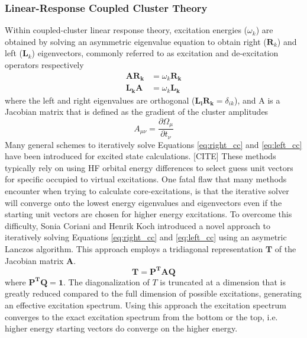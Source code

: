 \documentclass[final]{emory}
\begin{document}
\subsubsection{Linear-Response Coupled Cluster Theory}
Within coupled-cluster linear response theory, excitation energies ($\omega_{k}$) are obtained by solving an asymmetric eigenvalue equation to obtain right ($\mathbf{R}_k $) and left ($\mathbf{L}_k$) eigenvectors, commonly referred to as excitation and de-excitation operators respectively
\begin{align}
\label{eq:right_cc}
\mathbf{AR_k} &= \omega_k \mathbf{R_k} \\
\label{eq:left_cc}
\mathbf{L_kA} &= \omega_k \mathbf{L_k}
\end{align}
where the left and right eigenvalues are orthogonal ($\mathbf{L_iR_k} = \delta_{ik}$), and A is a Jacobian matrix that is defined as the gradient of the cluster amplitudes
\begin{equation}
A_{\mu \nu} = \frac{\partial \Omega_{\mu}}{\partial t_\nu}
\end{equation}
Many general schemes to iteratively solve Equations \ref{eq:right_cc} and \ref{eq:left_cc} have been introduced for excited state calculations. [CITE] These methods typically rely on using HF orbital energy differences to select guess unit vectors for specific occupied to virtual excitations. One fatal flaw that many methods encounter when trying to calculate core-excitations, is that the iterative solver will converge onto the lowest energy eigenvalues and eigenvectors even if the starting unit vectors are chosen for higher energy excitations. To overcome this difficulty, Sonia Coriani and Henrik Koch introduced a novel approach to iteratively solving Equations \ref{eq:right_cc} and \ref{eq:left_cc} using an asymetric Lanczos algorithm. This approach employs a tridiagonal representation $\mathbf{T}$ of the Jacobian matrix $\mathbf{A}$. 
\begin{equation}
\mathbf{T} = \mathbf{P^T A Q}
\end{equation}
where $\mathbf{P^TQ} = \mathbf{1}$. The diagonalization of $T$ is truncated at a dimension that is greatly reduced compared to the full dimension of possible excitations, generating an effective excitation spectrum. Using this approach the excitation spectrum converges to the exact excitation spectrum from the bottom or the top, i.e. higher energy starting vectors do converge on the higher energy. 
\end{document}
